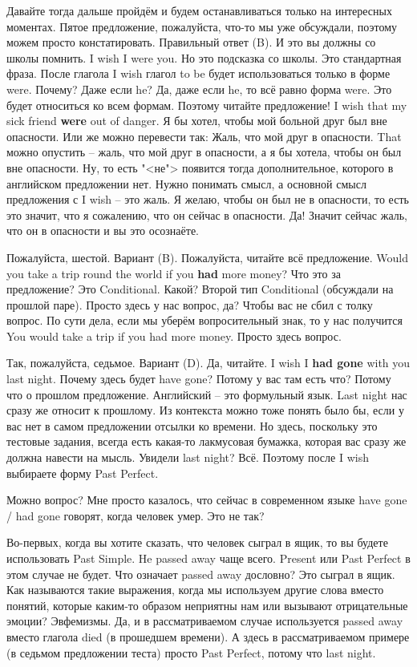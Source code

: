 \documentclass[main.tex]{subfiles}
\begin{document}
Давайте тогда дальше пройдём и будем останавливаться только на интересных моментах.
Пятое предложение, пожалуйста, что-то мы уже обсуждали, поэтому можем просто констатировать.
Правильный ответ (B).
И это вы должны со школы помнить.
I wish I were you.
Но это подсказка со школы.
Это стандартная фраза.
После глагола I wish глагол to be будет использоваться только в форме were.
Почему?
Даже если he?
Да, даже если he, то всё равно форма were.
Это будет относиться ко всем формам.
Поэтому читайте предложение!
I wish that my sick friend \textbf{were} out of danger.
Я бы хотел, чтобы мой больной друг был вне опасности.
Или же можно перевести так: Жаль, что мой друг в опасности.
That можно опустить -- жаль, что мой друг в опасности, а я бы хотела, чтобы он был вне опасности.
Ну, то есть "<не"> появится тогда дополнительное, которого в английском предложении нет.
Нужно понимать смысл, а основной смысл предложения с I wish -- это жаль.
Я желаю, чтобы он был не в опасности, то есть это значит, что я сожалению, что он сейчас в опасности.
Да!
Значит сейчас жаль, что он в опасности и вы это осознаёте.

Пожалуйста, шестой.
Вариант (B).
Пожалуйста, читайте всё предложение.
Would you take a trip round the world if you \textbf{had} more money?
Что это за предложение?
Это Conditional.
Какой?
Второй тип Conditional (обсуждали на прошлой паре).
Просто здесь у нас вопрос, да?
Чтобы вас не сбил с толку вопрос.
По сути дела, если мы уберём вопросительный знак, то у нас получится You would take a trip if you had more money.
Просто здесь вопрос.

Так, пожалуйста, седьмое.
Вариант (D).
Да, читайте.
I wish I \textbf{had gone} with you last night.
Почему здесь будет have gone?
Потому у вас там есть что?
Потому что о прошлом предложение.
Английский -- это формульный язык.
Last night нас сразу же относит к прошлому.
Из контекста можно тоже понять было бы, если у вас нет в самом предложении отсылки ко времени.
Но здесь, поскольку это тестовые задания, всегда есть какая-то лакмусовая бумажка, которая вас сразу же должна навести на мысль.
Увидели last night?
Всё.
Поэтому после I wish выбираете форму Past Perfect.

Можно вопрос?
Мне просто казалось, что сейчас в современном языке have gone / had gone говорят, когда человек умер.
Это не так?

Во-первых, когда вы хотите сказать, что человек сыграл в ящик, то вы будете использовать Past Simple.
He passed away чаще всего.
Present или Past Perfect в этом случае не будет.
Что означает passed away дословно?
Это сыграл в ящик.
Как называются такие выражения, когда мы используем другие слова вместо понятий, которые каким-то образом неприятны нам или вызывают отрицательные эмоции?
Эвфемизмы.
Да, и в рассматриваемом случае используется passed away вместо глагола died (в прошедшем времени).
А здесь в рассматриваемом примере (в седьмом предложении теста) просто Past Perfect, потому что last night.
\end{document}
